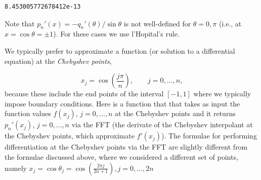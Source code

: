 \documentclass[12pt,a4paper]{article}
\begin{document}
\begin{lstlisting}
8.453005772678412e-13
\end{lstlisting}


Note that $p_n'(x) = -q_n'(\theta)/\sin \theta$ is not well-defined for $\theta = 0, \pi$ (i.e., at $x = \cos\theta =  \pm 1$).  For these cases we use l'Hopital's rule.

We typically prefer to approximate a function (or solution to a differential equation) at the \emph{Chebyshev points}, 

\[
x_j = \cos\left(\frac{j\pi}{n}\right), \qquad j = 0, \ldots, n,
\]
because these include the end points of the interval $[-1, 1]$ where we typically impose boundary conditions. Here is a function that that takes as input the function values $f(x_j)$, $j = 0, \ldots, n$ at the Chebyshev points and it returns $p_n'(x_j)$, $j = 0, \ldots, n$ via the FFT (the derivate of the Chebyshev interpolant at the Chebyshev points, which approximate $f'(x_j)$). The formulae for performing differentiation at the Chebyshev points via the FFT are slightly different from the formulae discussed above, where we considered a different set of points, namely $x_j = \cos\theta_j = \cos\left( \frac{2\pi j}{2n + 1}  \right), j = 0, \ldots, 2n$
\end{document}
